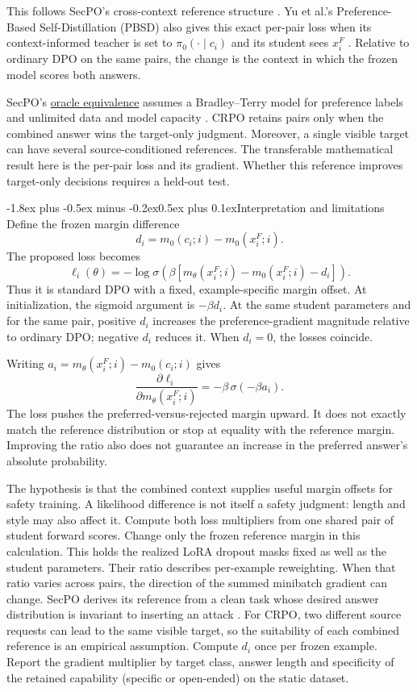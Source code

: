 \documentclass[11pt]{article}
\makeatletter
\renewcommand\subsection{\@startsection{subsection}{2}{\z@}%
  {-1.8ex plus -0.5ex minus -0.2ex}{0.5ex plus 0.1ex}{\normalfont\large\bfseries}}
\makeatother
\begin{document}
This follows SecPO's cross-context reference structure \cite{chen2026secpo}. Yu et al.'s Preference-Based Self-Distillation (PBSD) also gives this exact per-pair loss when its context-informed teacher is set to $\pi_0(\cdot\mid c_i)$ and its student sees $x_i^F$ \cite[Sec.~3.2, Eqs.~7--11]{yu2026pbsd}. Relative to ordinary DPO on the same pairs, the change is the context in which the frozen model scores both answers.

SecPO's \href{https://arxiv.org/html/2610.41998v1#A1.SS1}{oracle equivalence} assumes a Bradley--Terry model for preference labels and unlimited data and model capacity \cite[App.~A.1]{chen2026secpo}. CRPO retains pairs only when the combined answer wins the target-only judgment. Moreover, a single visible target can have several source-conditioned references. The transferable mathematical result here is the per-pair loss and its gradient. Whether this reference improves target-only decisions requires a held-out test.

\subsection{Interpretation and limitations}
Define the frozen margin difference
\[
d_i=m_0(c_i;i)-m_0(x_i^F;i).
\]
The proposed loss becomes
\[
\ell_i(\theta)
=-\log\sigma\!\left(
\beta[m_\theta(x_i^F;i)-m_0(x_i^F;i)-d_i]
\right).
\]
Thus it is standard DPO with a fixed, example-specific margin offset. At initialization, the sigmoid argument is $-\beta d_i$. At the same student parameters and for the same pair, positive $d_i$ increases the preference-gradient magnitude relative to ordinary DPO; negative $d_i$ reduces it. When $d_i=0$, the losses coincide.

Writing $a_i=m_\theta(x_i^F;i)-m_0(c_i;i)$ gives
\[
\frac{\partial\ell_i}{\partial m_\theta(x_i^F;i)}
=-\beta\,\sigma(-\beta a_i).
\]
The loss pushes the preferred-versus-rejected margin upward. It does not exactly match the reference distribution or stop at equality with the reference margin. Improving the ratio also does not guarantee an increase in the preferred answer's absolute probability.

The hypothesis is that the combined context supplies useful margin offsets for safety training. A likelihood difference is not itself a safety judgment: length and style may also affect it. Compute both loss multipliers from one shared pair of student forward scores. Change only the frozen reference margin in this calculation. This holds the realized LoRA dropout masks fixed as well as the student parameters. Their ratio describes per-example reweighting. When that ratio varies across pairs, the direction of the summed minibatch gradient can change. SecPO derives its reference from a clean task whose desired answer distribution is invariant to inserting an attack \cite[Sec.~3.2]{chen2026secpo}. For CRPO, two different source requests can lead to the same visible target, so the suitability of each combined reference is an empirical assumption. Compute $d_i$ once per frozen example. Report the gradient multiplier by target class, answer length and specificity of the retained capability (specific or open-ended) on the static dataset.
\end{document}
